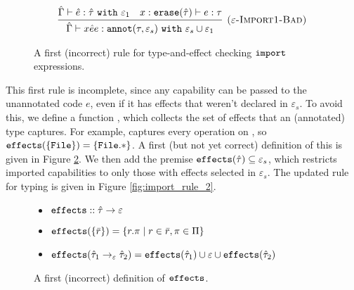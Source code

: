 \begin{figure}[h]
\vspace*{-5mm}
\[
\begin{array}{c}
\infer[\textsc{($\varepsilon$-Import1-Bad)}]
	{ \hat \Gamma \vdash {x}{\hat e}{e}: \kwa{annot}(\tau, \varepsilon_s)~\kw{with} \varepsilon_s \cup \varepsilon_1 }
	{ \hat \Gamma \vdash \hat e: \hat \tau~\kw{with} \varepsilon_1 & x: \kwa{erase}(\hat \tau) \vdash e: \tau }

\end{array}
\]
\vspace*{-5mm}
\caption{A first (incorrect) rule for type-and-effect checking $\mathtt{import}$ expressions.}
\vspace*{-5mm}
\label{fig:import_rule_1}
\end{figure}

This first rule is incomplete, since any capability can be passed to the unannotated
code $e$, even if it has effects that weren't declared in $\varepsilon_s$. To avoid
this, we define a function , which collects the
set of effects that an (annotated) type captures. For example, 
captures every operation on , so $\mathtt{effects}(\{\mathtt{File}\}) = \mathtt{\{File.*\}}$.
A first (but not yet correct) definition of this is given in Figure \ref{fig:fx_defn}.
We then add the premise $\mathtt{effects}(\hat \tau) \subseteq \varepsilon_s$,
which restricts imported capabilities to only those with effects selected in
$\varepsilon_s$. The updated rule for typing  is given in Figure
\ref{fig:import_rule_2}.

\begin{figure}
\vspace*{-5mm}
\begin{itemize}
	\setlength\itemsep{-0.2em}
\item[] $\mathtt{effects} :: \hat \tau \rightarrow \varepsilon$
	\item[] $\mathtt{effects}(\{ \bar r \}) = \{ r.\pi \mid r \in \bar r, \pi \in \Pi \}$
	\item[] $\mathtt{effects}(\hat \tau_1 \rightarrow_{\varepsilon} \hat \tau_2) = \mathtt{effects}(\hat \tau_1) \cup \varepsilon \cup \mathtt{effects}(\hat \tau_2)$
\end{itemize}
\vspace*{-5mm}
\caption{A first (incorrect) definition of $\mathtt{effects}$.}
\vspace*{-5mm}
\label{fig:fx_defn}
\end{figure}

